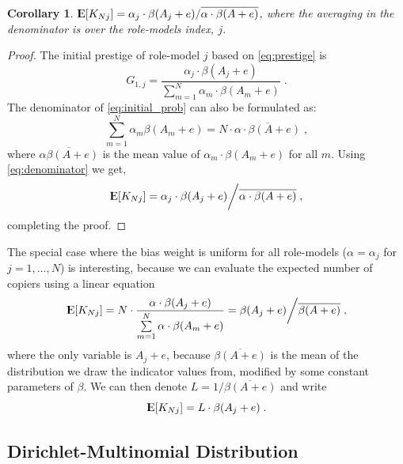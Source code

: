 \documentclass[12pt]{extarticle}
\DeclareMathOperator*{\E}{{\rm I\kern-.3em E}}
\newtheorem{corollary}{Corollary}
\begin{document}
\begin{corollary}
$\E[K_{Nj}] = \alpha_j \cdot \beta(A_j+e) / \overline{\alpha \cdot \beta(A+e)}$, where the averaging in the denominator is over the role-models index, $j$.
\end{corollary}

\begin{proof}
The initial prestige of role-model $j$ based on \cref{eq:prestige} is
\begin{equation}\label{eq:initial_prob}
G_{1,j} = \frac{\alpha_j\cdot\beta(A_j+e)}{\sum\limits_{m=1}^{N} \alpha_m\cdot\beta(A_m+e)} \;.
\end{equation}
The denominator of \cref{eq:initial_prob} can also be formulated as:
\begin{equation}\label{eq:denominator}
 \sum\limits_{m=1}^{N}\alpha_m\beta(A_m+e) = N \cdot \overline{\alpha \cdot \beta(A+e)} \;,
\end{equation}
where $\overline{\alpha\beta(A+e)}$ is the mean value of $\alpha_m\cdot\beta(A_m+e)$ for all $m$.
Using \cref{eq:denominator} we get, %
\begin{equation}
\E[K_{Nj}] = \alpha_j \cdot \beta(A_j+e) \bigg/ \overline{\alpha \cdot \beta(A+e)} \;,
\end{equation}
completing the proof.
\end{proof}

The special case where the bias weight is uniform for all role-models ($\alpha = \alpha_j$ for $j=1,\ldots, N$) is interesting, because we can evaluate the expected number of copiers using a linear equation
\begin{equation}
\E[K_{Nj}]= N\cdot\frac{\alpha\cdot\beta(A_j+e)}{\sum\limits_{m=1}^{N}\alpha\cdot\beta(A_m+e)} =\beta(A_j+e) \bigg/ \overline{\beta(A+e)} \;,
\end{equation}
where the only variable is $A_j+e$, because $\overline{\beta(A+e)}$ is the mean of the distribution we draw the indicator values from, modified by some constant parameters of $\beta$.
We can then denote $L = 1/\overline{\beta(A+e)}$ and write
\begin{equation}\label{eq:linearEq}
\E[K_{Nj}] = L\cdot \beta(A_j+e) \;.
\end{equation}


\subsection*{Dirichlet-Multinomial Distribution}
\end{document}
